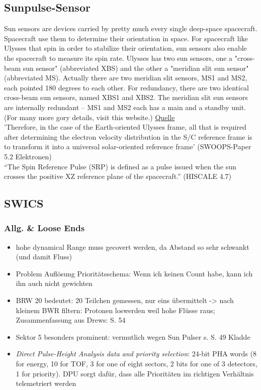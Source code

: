 \documentclass[]{article}
\begin{document}
	\subsection{Sunpulse-Sensor}
	Sun sensors are devices carried by pretty much every single deep-space spacecraft. Spacecraft use them to determine their orientation in space. For spacecraft like Ulysses that spin in order to stabilize their orientation, sun sensors also enable the spacecraft to measure its spin rate. Ulysses has two sun sensors, one a "cross-beam sun sensor" (abbreviated XBS) and the other a "meridian slit sun sensor" (abbreviated MS). Actually there are two meridian slit sensors, MS1 and MS2, each pointed 180 degrees to each other. For redundancy, there are two identical cross-beam sun sensors, named XBS1 and XBS2. The meridian slit sun sensors are internally redundant -- MS1 and MS2 each has a main and a standby unit. (For many more gory details, visit this website.)
	\href{http://www.planetary.org/blogs/emily-lakdawalla/2008/1661.html}{Quelle}\\[0.6cm]
	'Therefore, in the case of the Earth-oriented Ulysses frame, all that is required after determining the electron velocity distribution in the S/C reference frame is to transform it into a universal solar-oriented reference frame' (SWOOPS-Paper 5.2 Elektronen)\\[0.6cm]
	"`The Spin Reference Pulse (SRP) is defined as a pulse issued when the sun crosses the positive XZ reference plane of the spacecraft."' (HISCALE 4.7)
\subsection{SWICS}
\subsubsection{Allg. \& Loose Ends}
\begin{itemize}
	\item hohe dynamical Range muss gecovert werden, da Abstand so sehr schwankt (und damit Fluss)
	\item Problem Auflösung Prioritätsschema: Wenn ich keinen Count habe, kann ich ihn auch nicht gewichten
	\item BRW 20 bedeutet: 20 Teilchen gemessen, nur eins übermittelt -> nach kleinem BWR filtern: Protonen loswerden weil hohe Flüsse raus; Zusammenfassung aus Drews: S. 54
	\item Sektor 5 besonders prominent: vermutlich wegen Sun Pulser s. S. 49 Kladde
	\item \textit{Direct Pulse-Height Analysis data and priority selection}: 24-bit PHA words (8 for energy, 10 for TOF, 3 for one of eight sectors, 2 bits for one of 3 detectors, 1 for priority). DPU sorgt dafür, dass alle Prioritäten im richtigen Verhältnis telemetriert werden
\end{itemize}
%
%
%
\end{document}
